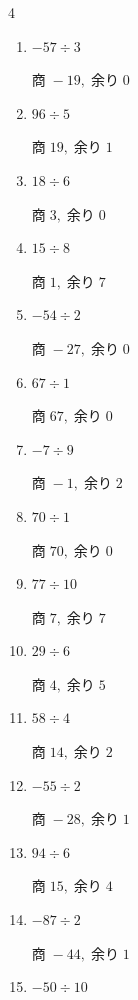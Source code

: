 \begin{multicols}{4}
\begin{enumerate}
        $商\; -46,\; 余り\; 1$

  \item $-57 \div 3$

        $商\; -19,\; 余り\; 0$

  \item $96 \div 5$

        $商\; 19,\; 余り\; 1$

  \item $18 \div 6$

        $商\; 3,\; 余り\; 0$

  \item $15 \div 8$

        $商\; 1,\; 余り\; 7$

  \item $-54 \div 2$

        $商\; -27,\; 余り\; 0$

  \item $67 \div 1$

        $商\; 67,\; 余り\; 0$

  \item $-7 \div 9$

        $商\; -1,\; 余り\; 2$

  \item $70 \div 1$

        $商\; 70,\; 余り\; 0$

  \item $77 \div 10$

        $商\; 7,\; 余り\; 7$

  \item $29 \div 6$

        $商\; 4,\; 余り\; 5$

  \item $58 \div 4$

        $商\; 14,\; 余り\; 2$

  \item $-55 \div 2$

        $商\; -28,\; 余り\; 1$

  \item $94 \div 6$

        $商\; 15,\; 余り\; 4$

\columnbreak %

  \item $-87 \div 2$

        $商\; -44,\; 余り\; 1$

  \item $-50 \div 10$


\end{enumerate}
\end{multicols}
